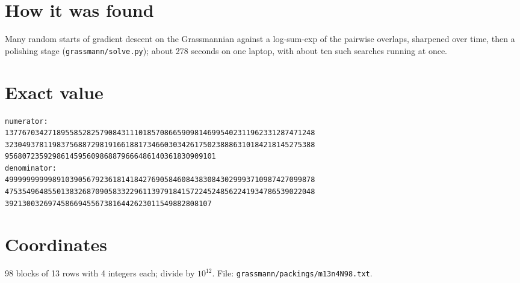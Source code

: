 \documentclass[11pt,a4paper]{article}
\begin{document}
\section{How it was found}
Many random starts of gradient descent on the Grassmannian against a log-sum-exp of the pairwise overlaps, sharpened over time, then a polishing stage (\texttt{grassmann/solve.py}); about 278 seconds on one laptop, with about ten such searches running at once.


\appendix
\section{Exact value}
{\small
\begin{verbatim}
numerator:
137767034271895585282579084311101857086659098146995402311962331287471248
323049378119837568872981916618817346603034261750238886310184218145275388
9568072359298614595609868879666486140361830909101
denominator:
499999999998910390567923618141842769058460843830843029993710987427099878
475354964855013832687090583322961139791841572245248562241934786539022048
392130032697458669455673816442623011549882808107
\end{verbatim}}

\section{Coordinates}
98 blocks of 13 rows with 4 integers each; divide by $10^{12}$. File: \texttt{grassmann/packings/m13n4N98.txt}.
{\tiny
\begin{multicols}{3}
\end{multicols}}
\end{document}
